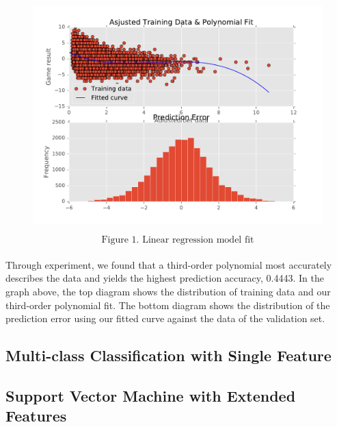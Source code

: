 \documentclass[12pt]{article}
\begin{document}
\paragraph{}
\begin{figure}[h]
\centering
\includegraphics[scale=0.5]{"linreg"}
\end{figure}
\[ \text{Figure 1. Linear regression model fit} \]

\paragraph{}
Through experiment, we found that a third-order polynomial most accurately describes the data and yields the highest prediction accuracy, 0.4443. In the graph above, the top diagram shows the distribution of training data and our third-order polynomial fit. The bottom diagram shows the distribution of the prediction error using our fitted curve against the data of the validation set.

\subsection{Multi-class Classification with Single Feature}
\subsection{Support Vector Machine with Extended Features}
\end{document}
